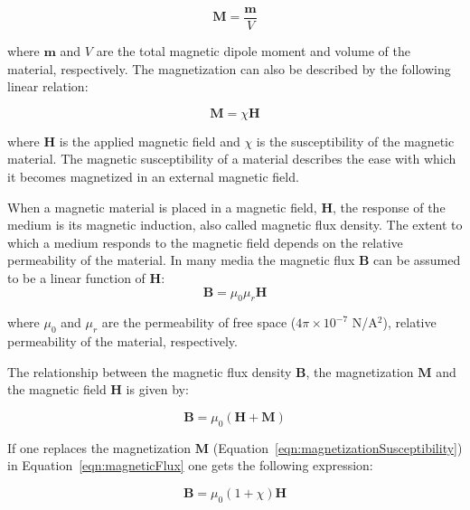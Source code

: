\begin{equation}
	\mathbf{M} = \frac{\mathbf{m}}{V}
	\label{eqn:magnetization}
\end{equation}

where $\mathbf{m}$ and $V$ are the total magnetic dipole moment and volume of the material, respectively. The magnetization can also be described by the following linear relation:

\begin{equation}
	\mathbf{M} = \chi \mathbf{H}
	\label{eqn:magnetizationSusceptibility}
\end{equation}

where $\mathbf{H}$ is the applied magnetic field and $\chi$ is the susceptibility of the magnetic material. The magnetic susceptibility of a material describes the ease with which it becomes magnetized in an external magnetic field.

When a magnetic material is placed in a magnetic field, $\mathbf{H}$, the response of the medium is its magnetic induction, also called magnetic flux density. The extent to which a medium responds to the magnetic field depends on the relative permeability of the material. In many media the magnetic flux $\mathbf{B}$ can be assumed to be a linear function of $\mathbf{H}$: %
\begin{equation}
	\mathbf{B} = \mu_{0}\mu_{r}\mathbf{H}
	\label{eqn:magneticFluxPermeability}
\end{equation}

where $\mu_{0}$ and $\mu_{r}$ are the permeability of free space ($4\pi \times 10^{-7}$ N/A$^{2}$), relative permeability of the material, respectively. 

The relationship between the magnetic flux density $\mathbf{B}$, the magnetization $\mathbf{M}$ and the magnetic field $\mathbf{H}$  is given by:

\begin{equation}
	\mathbf{B} = \mu_{0}(\mathbf{H} + \mathbf{M})
	\label{eqn:magneticFlux}
\end{equation}

If one replaces the magnetization $\mathbf{M}$ (Equation~\ref{eqn:magnetizationSusceptibility}) in Equation~\ref{eqn:magneticFlux} one gets the following expression:

\begin{equation}
	\mathbf{B} = \mu_{0}(1 + \chi)\mathbf{H}
	\label{eqn:magneticFluxSusceptibility}
\end{equation}

